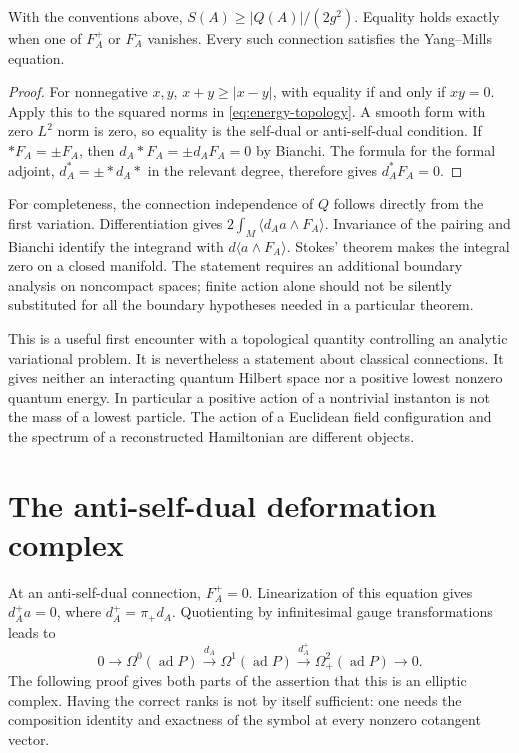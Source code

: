 \begin{proposition}
With the conventions above,
$S(A)\geq |Q(A)|/(2g^2)$.  Equality holds exactly when one of
$F_A^+$ or $F_A^-$ vanishes.  Every such connection satisfies the
Yang--Mills equation.
\end{proposition}

\begin{proof}
For nonnegative $x,y$, $x+y\geq|x-y|$, with equality if and only if
$xy=0$.  Apply this to the squared norms in
\eqref{eq:energy-topology}.  A smooth form with zero $L^2$ norm is zero,
so equality is the self-dual or anti-self-dual condition.  If
$*F_A=\pm F_A$, then $d_A*F_A=\pm d_AF_A=0$ by Bianchi.  The
formula for the formal adjoint, $d_A^*=\pm *d_A*$ in the relevant
degree, therefore gives $d_A^*F_A=0$.
\end{proof}

For completeness, the connection independence of $Q$ follows directly from
the first variation.  Differentiation gives
$2\int_M\langle d_Aa\wedge F_A\rangle$.
Invariance of the pairing and Bianchi identify the integrand with
$d\langle a\wedge F_A\rangle$.  Stokes' theorem makes the integral
zero on a closed manifold.  The statement requires an additional boundary
analysis on noncompact spaces; finite action alone should not be silently
substituted for all the boundary hypotheses needed in a particular theorem.

This is a useful first encounter with a topological quantity controlling an
analytic variational problem.  It is nevertheless a statement about
classical connections.  It gives neither an interacting quantum Hilbert
space nor a positive lowest nonzero quantum energy.  In particular a
positive action of a nontrivial instanton is not the mass of a lowest
particle.  The action of a Euclidean field configuration and the spectrum
of a reconstructed Hamiltonian are different objects.

\section{The anti-self-dual deformation complex}

At an anti-self-dual connection, $F_A^+=0$.  Linearization of this equation
gives $d_A^+a=0$, where $d_A^+=\pi_+d_A$.  Quotienting by
infinitesimal gauge transformations leads to
\begin{equation}
 0\longrightarrow\Omega^0(\operatorname{ad}P)
 \xrightarrow{d_A}\Omega^1(\operatorname{ad}P)
 \xrightarrow{d_A^+}\Omega^2_+(\operatorname{ad}P)
 \longrightarrow0.
 \label{eq:asd-complex}
\end{equation}
The following proof gives both parts of the assertion that this is an
elliptic complex.  Having the correct ranks is not by itself sufficient:
one needs the composition identity and exactness of the symbol at every
nonzero cotangent vector.

